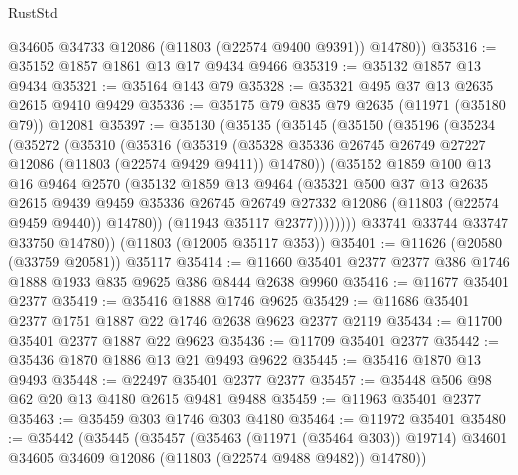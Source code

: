 \begin{lexlean}{RustStd}
\begin{coremodule}
        @34605
        @34733
        @12086
        (@11803 (@22574 @9400 @9391))
        @14780))
@35316 := @35152 @1857 @1861 @13 @17 @9434 @9466
@35319 := @35132 @1857 @13 @9434
@35321 := @35164 @143 @79
@35328 := @35321 @495 @37 @13 @2635 @2615 @9410 @9429
@35336 := @35175 @79 @835 @79 @2635 (@11971 (@35180 @79)) @12081
@35397 := @35130
    (@35135
      (@35145
        (@35150
          (@35196
            (@35234
              (@35272
                (@35310
                  (@35316
                    (@35319
                      (@35328
                        @35336
                        @26745
                        @26749
                        @27227
                        @12086
                        (@11803 (@22574 @9429 @9411))
                        @14780))
                    (@35152
                      @1859
                      @100
                      @13
                      @16
                      @9464
                      @2570
                      (@35132
                        @1859
                        @13
                        @9464
                        (@35321
                          @500
                          @37
                          @13
                          @2635
                          @2615
                          @9439
                          @9459
                          @35336
                          @26745
                          @26749
                          @27332
                          @12086
                          (@11803 (@22574 @9459 @9440))
                          @14780))
                      (@11943 @35117 @2377))))))))
        @33741
        @33744
        @33747
        @33750
        @14780))
    (@11803 (@12005 @35117 @353))
@35401 := @11626 (@20580 (@33759 @20581)) @35117
@35414 := @11660 @35401 @2377 @2377 @386 @1746 @1888 @1933 @835 @9625 @386 @8444 @2638 @9960
@35416 := @11677 @35401 @2377
@35419 := @35416 @1888 @1746 @9625
@35429 := @11686 @35401 @2377 @1751 @1887 @22 @1746 @2638 @9623 @2377 @2119
@35434 := @11700 @35401 @2377 @1887 @22 @9623
@35436 := @11709 @35401 @2377
@35442 := @35436 @1870 @1886 @13 @21 @9493 @9622
@35445 := @35416 @1870 @13 @9493
@35448 := @22497 @35401 @2377 @2377
@35457 := @35448 @506 @98 @62 @20 @13 @4180 @2615 @9481 @9488
@35459 := @11963 @35401 @2377
@35463 := @35459 @303 @1746 @303 @4180
@35464 := @11972 @35401
@35480 := @35442
    (@35445
      (@35457
        (@35463 (@11971 (@35464 @303)) @19714)
        @34601
        @34605
        @34609
        @12086
        (@11803 (@22574 @9488 @9482))
        @14780))

\end{coremodule}
\end{lexlean}
